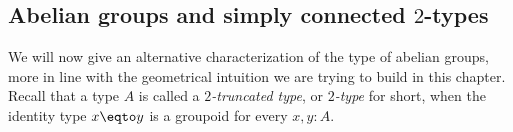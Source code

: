 \subsection{Abelian groups and simply connected $2$-types}
\label{sec:abel-groups-simply}

We will now give an alternative characterization of the type of
abelian groups, more in line with the geometrical intuition we are
trying to build in this chapter. Recall that a type $A$ is called a
{\em $2$-truncated type}, or {\em $2$-type} for short, when the
identity type $x\eqto y$ is a groupoid for every $x,y:A$.


